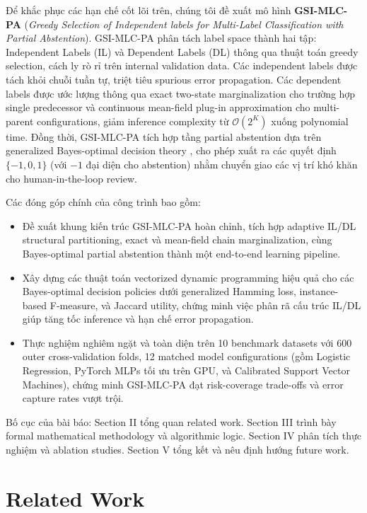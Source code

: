 \documentclass[conference]{IEEEtran}
\begin{document}
Để khắc phục các hạn chế cốt lõi trên, chúng tôi đề xuất mô hình \textbf{GSI-MLC-PA} (\textit{Greedy Selection of Independent labels for Multi-Label Classification with Partial Abstention}). GSI-MLC-PA phân tách label space thành hai tập: Independent Labels (IL) và Dependent Labels (DL) thông qua thuật toán greedy selection, cách ly rò rỉ trên internal validation data. Các independent labels được tách khỏi chuỗi tuần tự, triệt tiêu spurious error propagation. Các dependent labels được ước lượng thông qua exact two-state marginalization cho trường hợp single predecessor và continuous mean-field plug-in approximation cho multi-parent configurations, giảm inference complexity từ $\mathcal{O}(2^K)$ xuống polynomial time. Đồng thời, GSI-MLC-PA tích hợp tầng partial abstention dựa trên generalized Bayes-optimal decision theory \cite{nguyen2021multilabel}, cho phép xuất ra các quyết định $\{-1, 0, 1\}$ (với $-1$ đại diện cho abstention) nhằm chuyển giao các vị trí khó khăn cho human-in-the-loop review.

Các đóng góp chính của công trình bao gồm:
\begin{itemize}
    \item Đề xuất khung kiến trúc GSI-MLC-PA hoàn chỉnh, tích hợp adaptive IL/DL structural partitioning, exact và mean-field chain marginalization, cùng Bayes-optimal partial abstention thành một end-to-end learning pipeline.
    \item Xây dựng các thuật toán vectorized dynamic programming hiệu quả cho các Bayes-optimal decision policies dưới generalized Hamming loss, instance-based F-measure, và Jaccard utility, chứng minh việc phân rã cấu trúc IL/DL giúp tăng tốc inference và hạn chế error propagation.
    \item Thực nghiệm nghiêm ngặt và toàn diện trên 10 benchmark datasets với 600 outer cross-validation folds, 12 matched model configurations (gồm Logistic Regression, PyTorch MLPs tối ưu trên GPU, và Calibrated Support Vector Machines), chứng minh GSI-MLC-PA đạt risk-coverage trade-offs và error capture rates vượt trội.
\end{itemize}

Bố cục của bài báo: Section II tổng quan related work. Section III trình bày formal mathematical methodology và algorithmic logic. Section IV phân tích thực nghiệm và ablation studies. Section V tổng kết và nêu định hướng future work.

\section{Related Work}
\end{document}
